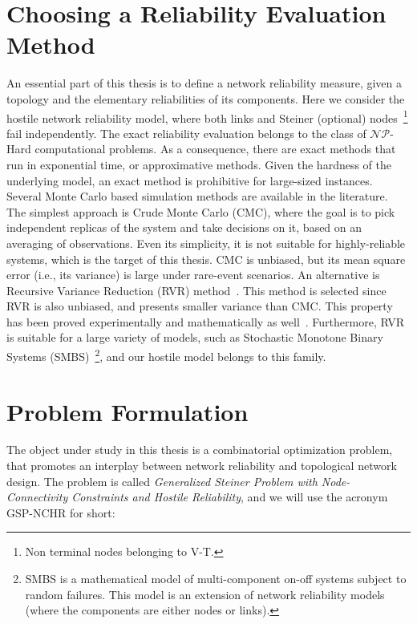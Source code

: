 \section{Choosing a Reliability Evaluation Method}\label{rm}
An essential part of this thesis is to define a network reliability measure, given a topology and 
the elementary reliabilities of its components. Here we consider the hostile network reliability model, 
where both links and Steiner (optional) nodes~\footnote{Non terminal nodes belonging to V-T.} fail independently. The exact reliability evaluation 
belongs to the class of $\mathcal{NP}$-Hard computational problems. As a consequence, there are exact methods that run in exponential time, or approximative methods. Given the hardness of the underlying model, an exact method is prohibitive for large-sized instances. Several Monte Carlo based simulation methods are available in the literature. The simplest approach is Crude Monte Carlo (CMC)\cite{105}, where the goal is to pick independent replicas of the system and take decisions on it, based on an averaging of observations. Even its simplicity, it is not suitable for highly-reliable systems, which is the target of this thesis. CMC is unbiased, but its mean square error (i.e., its variance) is large under rare-event scenarios. An alternative is Recursive Variance Reduction (RVR) method~\cite{4,85,78}. This method is selected since RVR is also unbiased, and presents smaller variance than CMC. This property has been proved experimentally and mathematically as well~\cite{85,2,78}. Furthermore, RVR is suitable for a large variety of models, such as Stochastic Monotone Binary Systems (SMBS)~\footnote{SMBS is a mathematical model of multi-component on-off  systems subject to random failures. This model is an extension of network reliability models (where  the  components are either nodes or links).}, and our hostile model belongs to this family\cite{82,107}. 


\section{Problem Formulation}%
The object under study in this thesis is a combinatorial optimization problem, that promotes an interplay between network reliability and topological network design. 
The problem is called \emph{Generalized Steiner Problem with Node-Connectivity Constraints and Hostile Reliability}, and we will use the acronym GSP-NCHR for short: 

